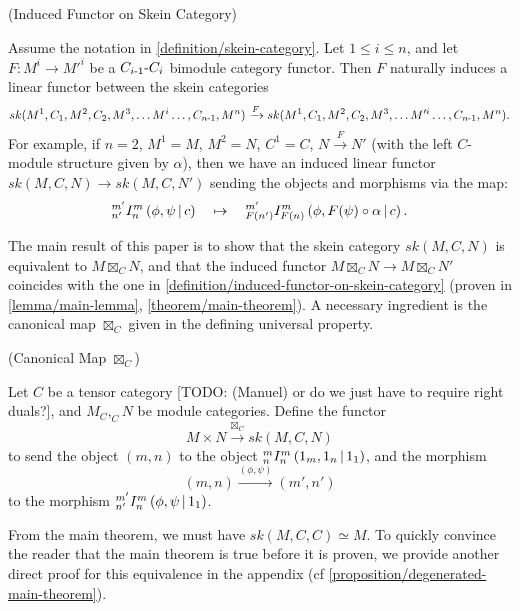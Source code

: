 \begin{definition} \label{definition/induced-functor-on-skein-category} (Induced Functor on Skein Category)

  \noindent Assume the notation in \ref{definition/skein-category}. Let
  $1 \leq i \leq n$, and let $F: M^{i} \to M'^{i}$ be a
  $C_{i{\text -}1}{\text -}C_{i}$ bimodule category functor. \quad Then $F$
  naturally induces a linear functor between the skein categories
  \[
    sk(M^{1}, C_{1}, M^{2}, C_{2}, M^{3}, \ldots M^{i} \ldots, C_{n{\text -}1}, M^{n})
    \xrightarrow{F}
    sk(M^{1}, C_{1}, M^{2}, C_{2}, M^{3}, \ldots M'^{i} \ldots, C_{n{\text -}1}, M^{n}).
  \]
  For example, if $n=2$, $M^{1} = M$, $M^{2} = N$, $C^{1} = C$, $N \xrightarrow{F} N'$
  (with the left $C$-module structure given by $\alpha$), then we have an
  induced linear functor $sk(M,C,N) \to sk(M,C,N')$ sending the objects and morphisms via the map:
  \[
    {}^{m'}_{n'} I^{m}_{n} \left( \phi, \psi \,\middle|\, c \right)
    \quad \mapsto \quad
    {}^{m'}_{F(n')} I^{m}_{F(n)} \left( \phi, F(\psi) \circ \alpha \,\middle|\, c \right).
  \]
\end{definition}

\noindent The main result of this paper is to show that the skein category
$sk(M,C,N)$ is equivalent to $M \boxtimes_{C} N$, and that the induced functor $M \boxtimes_{C} N \to M \boxtimes_{C} N'$
coincides with the one in \ref{definition/induced-functor-on-skein-category}
(proven in \ref{lemma/main-lemma}, \ref{theorem/main-theorem}). A necessary
ingredient is the canonical map $\boxtimes_{C}$ given in the defining universal
property.

\begin{definition}\label{definition/canonical-map} (Canonical Map $\boxtimes_{C}$)

  \noindent Let $C$ be a tensor category [TODO: (Manuel) or do we just have to require right duals?], and $M_{C}, _{C}N$ be module
  categories. \quad Define the functor
  \[
    M \times N \xrightarrow{\boxtimes_{C}} sk(M,C,N)
  \]
  to send the object $(m,n)$ to the object ${}^{m}_{n} I^{m}_{n} \left( 1_{m}, 1_{n} \,\middle|\, 1_{1} \right)$, and the morphism
  \[
    (m,n) \xrightarrow{(\phi, \psi)} (m', n')
  \]
  to the morphism ${}^{m'}_{n'} I^{m}_{n} \left( \phi, \psi \,\middle|\, 1_{1} \right)$.
\end{definition}

\noindent From the main theorem, we must have $sk(M,C,C) \simeq M$. To quickly
convince the reader that the main theorem is true before it is proven, we
provide another direct proof for this equivalence in the appendix (cf
\ref{proposition/degenerated-main-theorem}).

